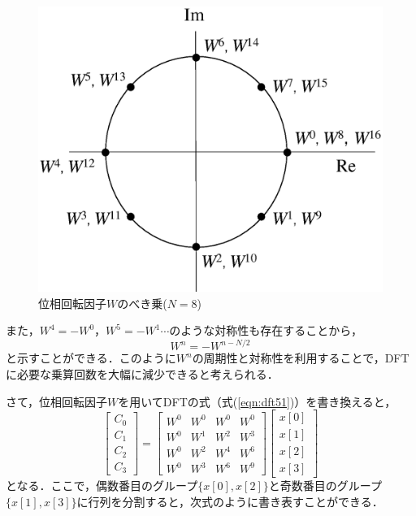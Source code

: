 \begin{figure}[H]
\begin{center}
\includegraphics[width=.6\textwidth]{fig/isou_kaiten.eps}
\end{center}
\caption{位相回転因子$W$のべき乗($N=8$)}
\label{fig:isou_kaiten}
\end{figure}

また，$W^4=-W^0$，$W^5=-W^1 \cdots$のような対称性も存在することから，
\begin{equation}
W^n=-W^{ n -N/2 }
\end{equation}
と示すことができる．このように$W^n$の周期性と対称性を利用することで，DFTに必要な乗算回数を大幅に減少できると考えられる．

さて，位相回転因子$W$を用いてDFTの式（式(\ref{eqn:dft51})）を書き換えると，
\begin{equation}
\begin{bmatrix}
C_0 \\
C_1 \\
C_2 \\
C_3
\end{bmatrix}
=
\begin{bmatrix}
W^0 & W^0 & W^0 & W^0 \\
W^0 & W^1 & W^2 & W^3 \\
W^0 & W^2 & W^4 & W^6 \\
W^0 & W^3 & W^6 & W^9
\end{bmatrix}
\begin{bmatrix}
x[0] \\
x[1] \\
x[2] \\
x[3]
\end{bmatrix}
\label{eqn:dft55}
\end{equation}
となる．ここで，偶数番目のグループ$\{x[0], x[2] \}$と奇数番目のグループ$\{x[1], x[3] \}$に行列を分割すると，次式のように書き表すことができる．

